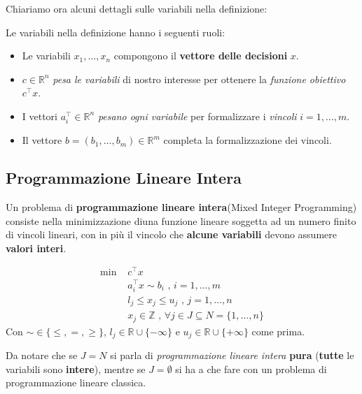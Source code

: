 Chiariamo ora alcuni dettagli sulle variabili nella definizione:

\begin{remark}
    Le variabili nella definizione hanno i seguenti ruoli:
    \begin{itemize}
        \item Le variabili $x_{1},\ldots,x_n$ compongono il \textbf{vettore delle decisioni} $x$.
        \item $c\in \mathbb{R}^n$ \textit{pesa le variabili} di nostro interesse per
            ottenere la \textit{funzione obiettivo} $c^\top x$.
        \item I vettori $a_i^\top\in \mathbb{R}^n$ \textit{pesano ogni variabile} per
            formalizzare i \textit{vincoli} $i=1,\ldots ,m$.
        \item Il vettore $b=(b_{1},\ldots ,b_m)\in \mathbb{R}^m$ completa la 
            formalizzazione dei vincoli.
    \end{itemize}
\end{remark}

\subsection{Programmazione Lineare Intera}

Un problema di \textbf{programmazione lineare intera}(Mixed Integer Programming) 
consiste nella minimizzazione diuna funzione lineare soggetta ad un numero 
finito di vincoli lineari, con in più il vincolo che \textbf{alcune variabili} 
devono assumere \textbf{valori interi}.

\begin{definition}
    \[
        \begin{aligned}
            \text{min } &c^\top x \\ 
                        &a_i^\top x \sim b_i \text{ , }i=1,\ldots,m \\ 
                        &l_j \le x_j \le u_j \text{ , }j=1,\ldots ,n \\ 
                        &x_j \in \mathbb{Z} \text{ , } \forall j\in J \subseteq N = \{1,\ldots ,n\}  
        \end{aligned}
    \] 
    Con $\sim \in \{\le , =, \ge \}  $, $l_j\in \mathbb{R} \cup \{-\infty\}  $ 
    e $u_j\in \mathbb{R}\cup \{+\infty\}$ come prima.
\end{definition}

Da notare che se $J=N$ si parla di \textit{programmazione lineare intera} \textbf{pura} 
(\textbf{tutte} le variabili sono \textbf{intere}), mentre se $J=\emptyset$ si
ha a che fare con un problema di programmazione lineare classica.

